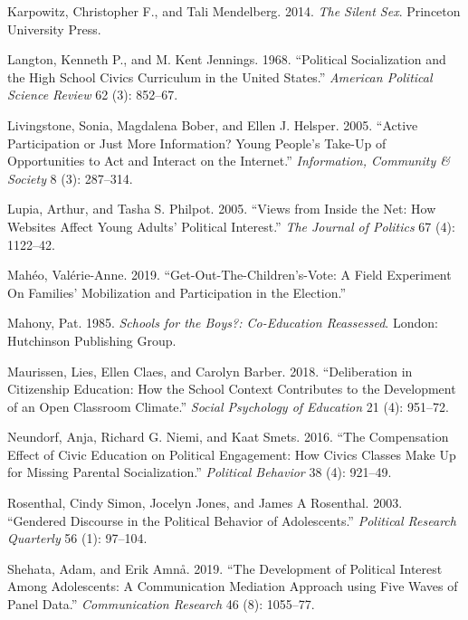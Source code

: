 \documentclass[
  letterpaper,
  DIV=11,
  numbers=noendperiod]{scrreprt}
\newlength{\cslhangindent}
\newlength{\cslentryspacingunit} %
\newenvironment{CSLReferences}[2] %
 {%
  \setlength{\parindent}{0pt}
  \ifodd #1
  \let\oldpar\par
  \def\par{\hangindent=\cslhangindent\oldpar}
  \fi
  \setlength{\parskip}{#2\cslentryspacingunit}
 }%
 {}
\begin{document}
\begin{CSLReferences}{1}{0}
\leavevmode{}%
Karpowitz, Christopher F., and Tali Mendelberg. 2014. \emph{{The Silent
Sex}}. Princeton University Press.

\leavevmode{}%
Langton, Kenneth P., and M. Kent Jennings. 1968. {``{Political
Socialization and the High School Civics Curriculum in the United
States}.''} \emph{American Political Science Review} 62 (3): 852--67.

\leavevmode{}%
Livingstone, Sonia, Magdalena Bober, and Ellen J. Helsper. 2005.
{``{Active Participation or Just More Information? Young People's
Take-Up of Opportunities to Act and Interact on the Internet}.''}
\emph{Information, Community \& Society} 8 (3): 287--314.

\leavevmode{}%
Lupia, Arthur, and Tasha S. Philpot. 2005. {``{Views from Inside the
Net: How Websites Affect Young Adults' Political Interest}.''} \emph{The
Journal of Politics} 67 (4): 1122--42.

\leavevmode{}%
Mahéo, Valérie-Anne. 2019. {``{Get-Out-The-Children's-Vote: A Field
Experiment On Families' Mobilization and Participation in the
Election}.''}

\leavevmode{}%
Mahony, Pat. 1985. \emph{{Schools for the Boys?: Co-Education
Reassessed}}. London: Hutchinson Publishing Group.

\leavevmode{}%
Maurissen, Lies, Ellen Claes, and Carolyn Barber. 2018. {``{Deliberation
in Citizenship Education: How the School Context Contributes to the
Development of an Open Classroom Climate}.''} \emph{Social Psychology of
Education} 21 (4): 951--72.

\leavevmode{}%
Neundorf, Anja, Richard G. Niemi, and Kaat Smets. 2016. {``{The
Compensation Effect of Civic Education on Political Engagement: How
Civics Classes Make Up for Missing Parental Socialization}.''}
\emph{Political Behavior} 38 (4): 921--49.

\leavevmode{}%
Rosenthal, Cindy Simon, Jocelyn Jones, and James A Rosenthal. 2003.
{``{Gendered Discourse in the Political Behavior of Adolescents}.''}
\emph{Political Research Quarterly} 56 (1): 97--104.

\leavevmode{}%
Shehata, Adam, and Erik Amnå. 2019. {``{The Development of Political
Interest Among Adolescents: A Communication Mediation Approach using
Five Waves of Panel Data}.''} \emph{Communication Research} 46 (8):
1055--77.


\end{CSLReferences}
\end{document}
